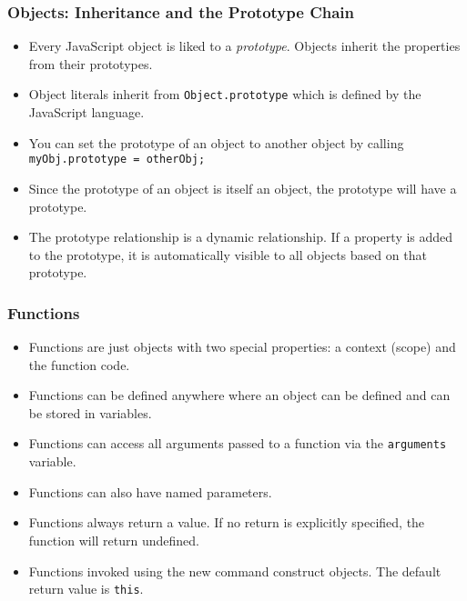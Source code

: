 \documentclass{lug}
\begin{document}
\begin{frame}
    \frametitle{Objects: Inheritance and the Prototype Chain}

    \begin{itemize}[<+->]
        \item Every JavaScript object is liked to a \textit{prototype}. Objects inherit the
            properties from their prototypes.

        \item Object literals inherit from \texttt{Object.prototype} which is defined by the
            JavaScript language.

        \item You can set the prototype of an object to another object by calling
            \texttt{myObj.prototype = otherObj;}

        \item Since the prototype of an object is itself an object, the prototype will have a
            prototype.

        \item The prototype relationship is a dynamic relationship. If a property is added to the
            prototype, it is automatically visible to all objects based on that prototype.
    \end{itemize}

\end{frame}

\begin{frame}
    \frametitle{Functions}

    \begin{itemize}[<+->]
        \item Functions are just objects with two special properties: a context (scope) and the
            function code.
        \item Functions can be defined anywhere where an object can be defined and can be stored in
            variables.
        \item Functions can access all arguments passed to a function via the \texttt{arguments}
            variable.
        \item Functions can also have named parameters.
        \item Functions always return a value. If no return is explicitly specified, the function
            will return undefined.
        \item Functions invoked using the new command construct objects. The default return value is
            \texttt{this}.
    \end{itemize}
\end{frame}
\end{document}
